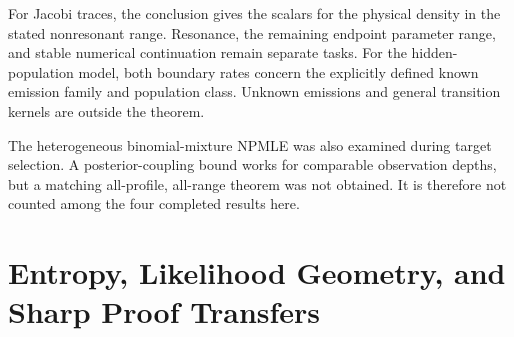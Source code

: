 \documentclass[11pt,a4paper]{article}
\theoremstyle{definition}
\theoremstyle{remark}
\numberwithin{equation}{section}
\newcommand{\collectedpart}[1]{%
 \clearpage\part{#1}%
 \setcounter{section}{0}%
 \renewcommand{\thesection}{\Roman{part}.\arabic{section}}%
 \renewcommand{\theHsection}{p\arabic{part}.s\arabic{section}}%
 \renewcommand{\arraystretch}{1}%
}
\begin{document}
For Jacobi traces, the conclusion gives the scalars for the physical
density in the stated nonresonant range. Resonance, the remaining endpoint
parameter range, and stable numerical continuation remain separate tasks.
For the hidden-population model, both boundary rates concern the explicitly
defined known emission family and population class. Unknown emissions and
general transition kernels are outside the theorem.

The heterogeneous binomial-mixture NPMLE was also examined during target
selection. A posterior-coupling bound works for comparable observation
depths, but a matching all-profile, all-range theorem was not obtained.
It is therefore not counted among the four completed results here.



\collectedpart{Entropy, Likelihood Geometry, and Sharp Proof Transfers}\label{part:3}

\begin{abstract}
We transfer entropy--transport and singularity methods to five specified
problems. For binomial population recovery, every ordinary unrestricted
nonparametric maximum-likelihood estimator attains the sharp Wasserstein
risk under an unknown fraction of adversarially replaced reports; the
estimator requires no modification and no contamination parameter.
A second theorem proves uniform minimax optimality for a joint likelihood
with arbitrarily many depth-one observations and any number of observations
at a common deeper level. Its key identity is an affine posterior tilt,
which repairs the failure of stratumwise normalization.
For exponential families, likelihood contact gives a conditional
moment-generating-function bound and an entropy bound for posterior
barycenter movement. Gaussian and Poisson applications give martingale
couplings and high-information minimax regimes, with explicit boundary
and approximation limitations.
Beyond statistics, the worst D-optimal/A-optimal design ratio over all
connected graphs is of order $\sqrt n$: an electrical maximum-principle
argument yields a universal upper bound $\sqrt{n/8}+1/2$, and complete-graph
barbells improve the preceding tree lower constant.
Finally, the minimum recurrence width of phase-weighted central binomial
power sums is classified on the entire unit circle: it is $r$ at every
nonreal phase and drops at the two real phases. A polynomial moment
reduction supplies the matching upper bound.
All five developments distinguish previously proved ingredients from
new arguments and state the unresolved extensions explicitly.
\end{abstract}
\end{document}
